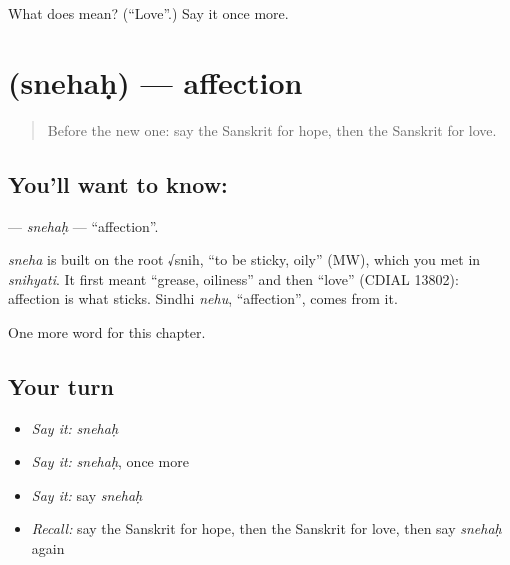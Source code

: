 \begin{tcolorbox}[breakable,colback=teal!4,colframe=teal!35!black,title={Before you move on}]
What does  mean? (\textquotedblleft{}Love\textquotedblright{}.) Say it once more.
\end{tcolorbox}
\section[\texorpdfstring{\sk{स्नेहः} (snehaḥ)}{स्नेहः (snehaḥ)}]{ (snehaḥ) — affection}

\label{lesson:SA-C239-snehah}



\begin{quote}
Before the new one: say the Sanskrit for hope, then the Sanskrit for love.
\end{quote}

\subsection*{You'll want to know: }
\textbf{} — \emph{snehaḥ} — \textquotedblleft{}affection\textquotedblright{}.

\begin{cousinweb}
\emph{sneha} is built on the root √snih, \textquotedblleft{}to be sticky, oily\textquotedblright{} (MW), which you met in \emph{snihyati}. It first meant \textquotedblleft{}grease, oiliness\textquotedblright{} and then \textquotedblleft{}love\textquotedblright{} (CDIAL 13802): affection is what sticks. Sindhi \emph{nehu}, \textquotedblleft{}affection\textquotedblright{}, comes from it.
\end{cousinweb}

\begin{grammarlens}[title={What you've built}]
One more word for this chapter.
\end{grammarlens}

\subsection*{Your turn}
\begin{itemize}
\raggedright
  \item \emph{Say it:} \emph{snehaḥ}
  \item \emph{Say it:} \emph{snehaḥ}, once more
  \item \emph{Say it:} say \emph{snehaḥ}
  \item \emph{Recall:} say the Sanskrit for hope, then the Sanskrit for love, then say \emph{snehaḥ} again
\end{itemize}

